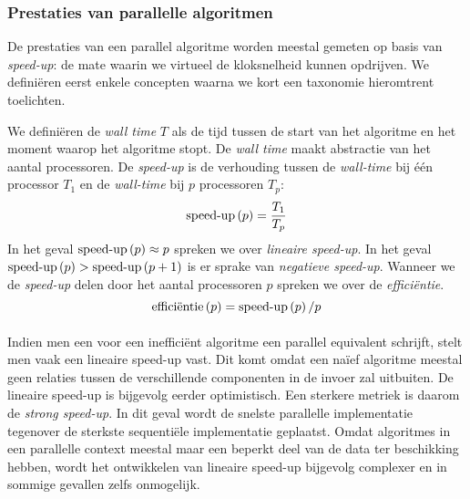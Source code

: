 \subsubsection{Prestaties van parallelle algoritmen}

De prestaties van een parallel algoritme worden meestal gemeten op basis van \emph{speed-up}: de mate waarin we virtueel de kloksnelheid kunnen opdrijven. We defini\"eren eerst enkele concepten waarna we kort een taxonomie hieromtrent toelichten.

\begin{definition}
We defini\"eren de \emph{wall time} $T$ als de tijd tussen de start van het algoritme en het moment waarop het algoritme stopt. De \emph{wall time} maakt abstractie van het aantal processoren. De \emph{speed-up} is de verhouding tussen de \emph{wall-time} bij \'e\'en processor $T_1$ en de \emph{wall-time} bij $p$ processoren $T_p$:
\begin{equation}
\mbox{speed-up}\left(p\right)=\displaystyle\frac{T_1}{T_p}
\end{equation}
In het geval $\mbox{speed-up}\left(p\right)\approx p$ spreken we over \emph{lineaire speed-up}. In het geval $\mbox{speed-up}\left(p\right)>\mbox{speed-up}\left(p+1\right)$ is er sprake van \emph{negatieve speed-up}. Wanneer we de \emph{speed-up} delen door het aantal processoren $p$ spreken we over de \emph{effici\"entie}.
\begin{equation}
\mbox{effici\"entie}\left(p\right)=\mbox{speed-up}\left(p\right)/p
\end{equation}
\end{definition}

\paragraph{}
Indien men een voor een ineffici\"ent algoritme een parallel equivalent schrijft, stelt men vaak een lineaire speed-up vast. Dit komt omdat een na\"ief algoritme meestal geen relaties tussen de verschillende componenten in de invoer zal uitbuiten. De lineaire speed-up is bijgevolg eerder optimistisch. Een sterkere metriek is daarom de \emph{strong speed-up}. In dit geval wordt de snelste parallelle implementatie tegenover de sterkste sequenti\"ele implementatie geplaatst. Omdat algoritmes in een parallelle context meestal maar een beperkt deel van de data ter beschikking hebben, wordt het ontwikkelen van lineaire speed-up bijgevolg complexer en in sommige gevallen zelfs onmogelijk.

